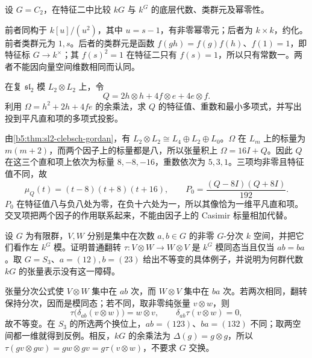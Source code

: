 \begin{optionalexercise}\label{b5:ex:21:04}
	设 \(G=C_2\)，在特征二中比较 \(kG\) 与 \(k^G\) 的底层代数、类群元及幂零性。
\end{optionalexercise}
\begin{solution}
	前者同构于 \(k[u]/(u^2)\)，其中 \(u=s-1\)，有非零幂零元；后者为 \(k\times k\)，约化。前者类群元为 \(1,s\)。后者的类群元是函数 \(f(gh)=f(g)f(h)\)、\(f(1)=1\)，即特征标 \(G\to k^\times\)；其 \(f(s)^2=1\) 在特征二只有 \(f(s)=1\)，所以只有常数一。两者不能因向量空间维数相同而认同。
\end{solution}

\begin{optionalexercise}\label{b5:ex:21:05}
	在复 \(\mathfrak{sl}_2\) 模 \(L_2\otimes L_2\) 上，令
	\[
		Q=2h\otimes h+4f\otimes e+4e\otimes f.
	\]
	利用 \(\Omega=h^2+2h+4fe\) 的余乘法，求 \(Q\) 的特征值、重数和最小多项式，并写出投到平凡直和项的多项式投影。
\end{optionalexercise}
\begin{solution}
	由\cref{b5:thm:sl2-clebsch-gordan}，有 \(L_2\otimes L_2\cong L_4\oplus L_2\oplus L_0\)。\(\Omega\) 在 \(L_m\) 上的标量为 \(m(m+2)\)，而两个因子上的标量都是八，所以张量积上 \(\Omega=16I+Q\)。因此 \(Q\) 在这三个直和项上依次为标量 \(8,-8,-16\)，重数依次为 \(5,3,1\)。三项均非零且特征值不同，故
	\[
		\mu_Q(t)=(t-8)(t+8)(t+16),\qquad P_0=\dfrac{(Q-8I)(Q+8I)}{192}.
	\]
	\(P_0\) 在特征值八与负八处为零，在负十六处为一，所以其像恰为一维平凡直和项。交叉项把两个因子的作用联系起来，不能由因子上的 Casimir 标量相加代替。
\end{solution}

\begin{optionalexercise}\label{b5:ex:21:06}
	设 \(G\) 为有限群，\(V,W\) 分别是集中在次数 \(a,b\in G\) 的非零 \(G\)-分次 \(k\) 空间，并把它们看作左 \(k^G\) 模。证明普通翻转 \(\tau:V\otimes W\to W\otimes V\) 是 \(k^G\) 模同态当且仅当 \(ab=ba\)。取 \(G=S_3\)、\(a=(12),b=(23)\) 给出不等变的具体例子，并说明为何群代数 \(kG\) 的张量表示没有这一障碍。
\end{optionalexercise}
\begin{solution}
	张量分次公式使 \(V\otimes W\) 集中在 \(ab\) 次，而 \(W\otimes V\) 集中在 \(ba\) 次。若两次相同，翻转保持分次，因而是模同态；若不同，取非零纯张量 \(v\otimes w\)，则
	\[
		\tau\bigl(\delta_{ab}(v\otimes w)\bigr)=w\otimes v, \qquad \delta_{ab}\tau(v\otimes w)=0,
	\]
	故不等变。在 \(S_3\) 的所选两个换位上，\(ab=(123)\)、\(ba=(132)\) 不同；取两空间都一维就得到反例。相反，\(kG\) 的余乘法为 \(\Delta(g)=g\otimes g\)，所以 \(\tau(gv\otimes gw)=gw\otimes gv=g\tau(v\otimes w)\)，不要求 \(G\) 交换。
\end{solution}

